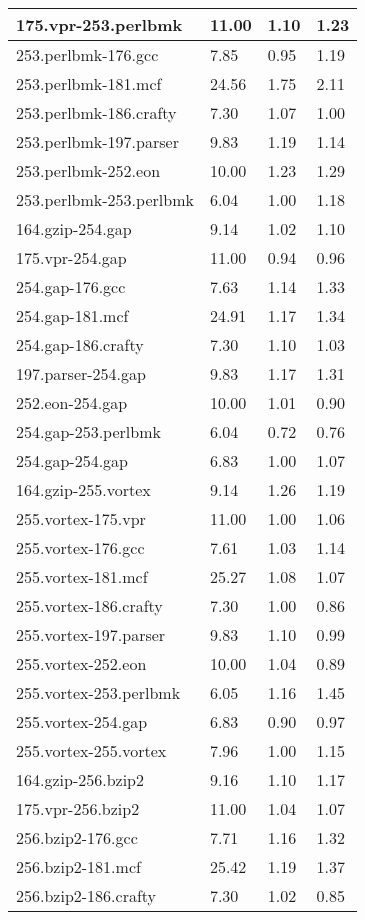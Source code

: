 \begin{table}
\begin{tabular}{|l|l|l|l|}
\hline
175.vpr-253.perlbmk&11.00&1.10&1.23\\
\hline
253.perlbmk-176.gcc&7.85&0.95&1.19\\
\hline
253.perlbmk-181.mcf&24.56&1.75&2.11\\
\hline
253.perlbmk-186.crafty&7.30&1.07&1.00\\
\hline
253.perlbmk-197.parser&9.83&1.19&1.14\\
\hline
253.perlbmk-252.eon&10.00&1.23&1.29\\
\hline
253.perlbmk-253.perlbmk&6.04&1.00&1.18\\
\hline
164.gzip-254.gap&9.14&1.02&1.10\\
\hline
175.vpr-254.gap&11.00&0.94&0.96\\
\hline
254.gap-176.gcc&7.63&1.14&1.33\\
\hline
254.gap-181.mcf&24.91&1.17&1.34\\
\hline
254.gap-186.crafty&7.30&1.10&1.03\\
\hline
197.parser-254.gap&9.83&1.17&1.31\\
\hline
252.eon-254.gap&10.00&1.01&0.90\\
\hline
254.gap-253.perlbmk&6.04&0.72&0.76\\
\hline
254.gap-254.gap&6.83&1.00&1.07\\
\hline
164.gzip-255.vortex&9.14&1.26&1.19\\
\hline
255.vortex-175.vpr&11.00&1.00&1.06\\
\hline
255.vortex-176.gcc&7.61&1.03&1.14\\
\hline
255.vortex-181.mcf&25.27&1.08&1.07\\
\hline
255.vortex-186.crafty&7.30&1.00&0.86\\
\hline
255.vortex-197.parser&9.83&1.10&0.99\\
\hline
255.vortex-252.eon&10.00&1.04&0.89\\
\hline
255.vortex-253.perlbmk&6.05&1.16&1.45\\
\hline
255.vortex-254.gap&6.83&0.90&0.97\\
\hline
255.vortex-255.vortex&7.96&1.00&1.15\\
\hline
164.gzip-256.bzip2&9.16&1.10&1.17\\
\hline
175.vpr-256.bzip2&11.00&1.04&1.07\\
\hline
256.bzip2-176.gcc&7.71&1.16&1.32\\
\hline
256.bzip2-181.mcf&25.42&1.19&1.37\\
\hline
256.bzip2-186.crafty&7.30&1.02&0.85\\
\hline

\end{tabular}
\end{table}
